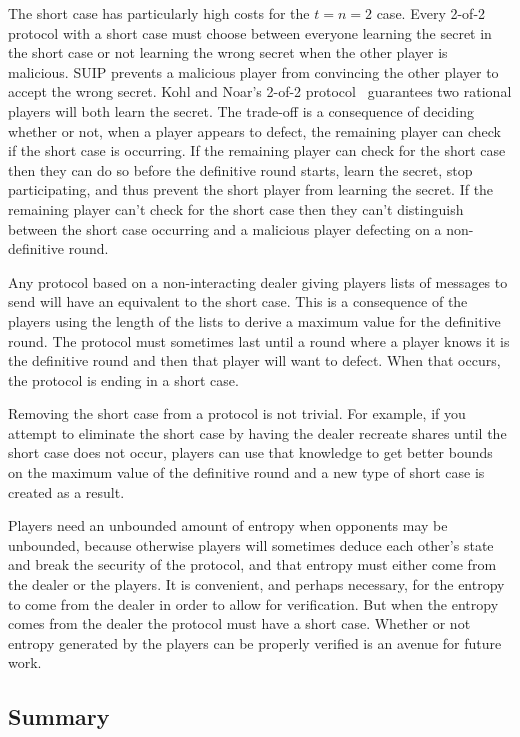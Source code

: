 \documentclass{dalcsthesis}
\begin{document}
The short case has particularly high costs for the $t=n=2$ case. Every 2-of-2 protocol with a short case must choose between everyone learning the secret in the short case or not learning the wrong secret when the other player is malicious. SUIP prevents a malicious player from convincing the other player to accept the wrong secret. Kohl and Noar's 2-of-2 protocol~\cite{kol08} guarantees two rational players will both learn the secret. The trade-off is a consequence of deciding whether or not, when a player appears to defect, the remaining player can check if the short case is occurring. If the remaining player can check for the short case then they can do so before the definitive round starts, learn the secret, stop participating, and thus prevent the short player from learning the secret. If the remaining player can't check for the short case then they can't distinguish between the short case occurring and a malicious player defecting on a non-definitive round.

Any protocol based on a non-interacting dealer giving players lists of messages to send will have an equivalent to the short case. This is a consequence of the players using the length of the lists to derive a maximum value for the definitive round. The protocol must sometimes last until a round where a player knows it is the definitive round and then that player will want to defect. When that occurs, the protocol is ending in a short case.

Removing the short case from a protocol is not trivial. For example, if you attempt to eliminate the short case by having the dealer recreate shares until the short case does not occur, players can use that knowledge to get better bounds on the maximum value of the definitive round and a new type of short case is created as a result.

Players need an unbounded amount of entropy when opponents may be unbounded, because otherwise players will sometimes deduce each other's state and break the security of the protocol, and that entropy must either come from the dealer or the players. It is convenient, and perhaps necessary, for the entropy to come from the dealer in order to allow for verification. But when the entropy comes from the dealer the protocol must have a short case. Whether or not entropy generated by the players can be properly verified is an avenue for future work.


\subsection{Summary}
\end{document}
